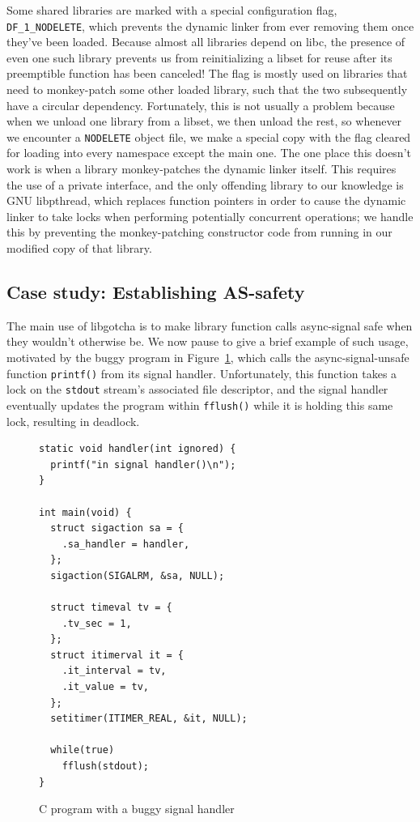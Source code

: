Some shared libraries are marked with a special configuration flag,
\texttt{DF\_1\_NODELETE}, which prevents the dynamic linker from ever removing them
once they've been loaded.  Because almost all libraries depend on libc, the presence
of even one such library prevents us from reinitializing a libset for reuse after
its preemptible function has been canceled!  The flag is mostly used on libraries
that need
to monkey-patch some other loaded library, such that the two subsequently have a
circular dependency.  Fortunately, this is not usually a problem because when we
unload one library from a libset, we then unload the rest, so whenever we encounter a
\texttt{NODELETE} object file, we make a special copy with the flag cleared for
loading into every namespace except the main one.  The one place this doesn't work is
when a library monkey-patches the dynamic linker itself.  This
requires the use of a private interface, and the only offending library to our
knowledge is GNU libpthread, which replaces function pointers in order to cause the
dynamic linker to take locks when performing potentially concurrent operations; we
handle this by preventing the monkey-patching constructor code from running in our
modified copy of that library.

\subsection{Case study: Establishing AS-safety}
\label{sec:statefulness}

The main use of libgotcha is to make library function calls async-signal safe when
they wouldn't otherwise be.  We now pause to give a brief example of such usage,
motivated by the buggy program in Figure~\ref{sec:handlerbug}, which calls the
async-signal-unsafe function \texttt{printf()} from its signal handler.
Unfortunately, this function takes a lock on the \texttt{stdout} stream's associated
file descriptor, and the signal handler eventually updates the program within
\texttt{fflush()} while it is holding this same lock, resulting in deadlock.

\begin{figure}
\begin{verbatim}
static void handler(int ignored) {
  printf("in signal handler()\n");
}

int main(void) {
  struct sigaction sa = {
    .sa_handler = handler,
  };
  sigaction(SIGALRM, &sa, NULL);

  struct timeval tv = {
    .tv_sec = 1,
  };
  struct itimerval it = {
    .it_interval = tv,
    .it_value = tv,
  };
  setitimer(ITIMER_REAL, &it, NULL);

  while(true)
    fflush(stdout);
}
\end{verbatim}
\caption{C program with a buggy signal handler}
\label{sec:handlerbug}
\end{figure}

